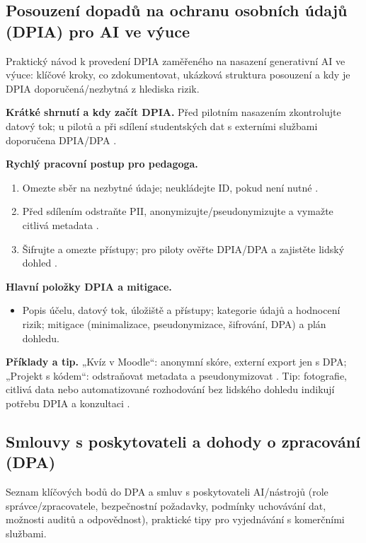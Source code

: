 \documentclass{report}%
\begin{document}
%
\subsection{Posouzení dopadů na ochranu osobních údajů (DPIA) pro AI ve výuce}%
Praktický návod k provedení DPIA zaměřeného na nasazení generativní AI ve výuce: klíčové kroky, co zdokumentovat, ukázková struktura posouzení a kdy je DPIA doporučená/nezbytná z hlediska rizik.%


%
\textbf{Krátké shrnutí a kdy začít DPIA.} Před pilotním nasazením zkontrolujte datový tok; u pilotů a při sdílení studentských dat s externími službami doporučena DPIA/DPA \cite{kb_ai_101_tipu_pdf_04e4a115_page_8_1}.

\textbf{Rychlý pracovní postup pro pedagoga.}
\begin{enumerate}
\item Omezte sběr na nezbytné údaje; neukládejte ID, pokud není nutné \cite{kb_ai_101_tipu_pdf_04e4a115_page_8_1}.
\item Před sdílením odstraňte PII, anonymizujte/pseudonymizujte a vymažte citlivá metadata \cite{kb_ai_101_tipu_pdf_04e4a115_page_8_1}.
\item Šifrujte a omezte přístupy; pro piloty ověřte DPIA/DPA a zajistěte lidský dohled \cite{kb_ai_101_tipu_pdf_04e4a115_page_8_1, kb_malinka_chatgpt_ve_vyuce_dva_roky_pote_2024_pdf_90bc3aaf_page_12_1}.
\end{enumerate}

\textbf{Hlavní položky DPIA a mitigace.}
\begin{itemize}
\item Popis účelu, datový tok, úložiště a přístupy; kategorie údajů a hodnocení rizik; mitigace (minimalizace, pseudonymizace, šifrování, DPA) a plán dohledu.
\end{itemize}

\textbf{Příklady a tip.} „Kvíz v Moodle“: anonymní skóre, externí export jen s DPA; „Projekt s kódem“: odstraňovat metadata a pseudonymizovat \cite{kb_ai_101_tipu_pdf_04e4a115_page_8_1}. Tip: fotografie, citlivá data nebo automatizované rozhodování bez lidského dohledu indikují potřebu DPIA a konzultaci \cite{kb_ai_101_tipu_pdf_04e4a115_page_8_1, kb_malinka_chatgpt_ve_vyuce_dva_roky_pote_2024_pdf_90bc3aaf_page_12_1}.%

%
\subsection{Smlouvy s poskytovateli a dohody o zpracování (DPA)}%
Seznam klíčových bodů do DPA a smluv s poskytovateli AI/nástrojů (role správce/zpracovatele, bezpečnostní požadavky, podmínky uchovávání dat, možnosti auditů a odpovědnost), praktické tipy pro vyjednávání s komerčními službami.%
\end{document}
